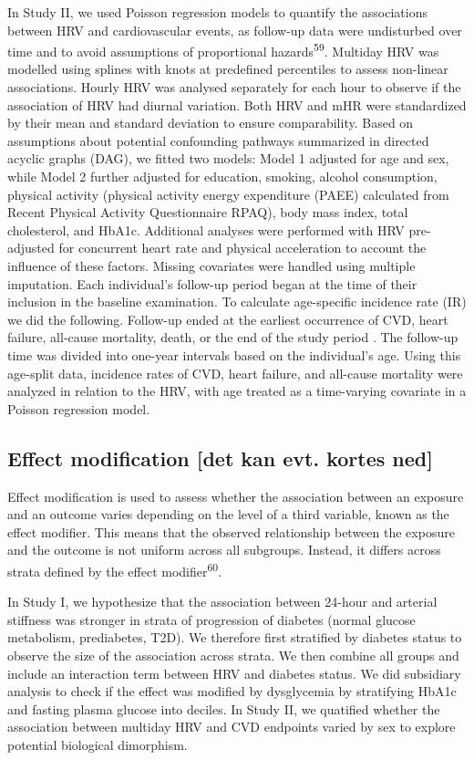 \documentclass[
  a4paper,
  headsepline=true,
  open=any]{scrbook}
\begin{document}
In Study II, we used Poisson regression models to quantify the
associations between HRV and cardiovascular events, as follow-up data
were undisturbed over time and to avoid assumptions of proportional
hazards\textsuperscript{59}. Multiday HRV was modelled using splines
with knots at predefined percentiles to assess non-linear associations.
Hourly HRV was analysed separately for each hour to observe if the
association of HRV had diurnal variation. Both HRV and mHR were
standardized by their mean and standard deviation to ensure
comparability. Based on assumptions about potential confounding pathways
summarized in directed acyclic graphs (DAG), we fitted two models: Model
1 adjusted for age and sex, while Model 2 further adjusted for
education, smoking, alcohol consumption, physical activity (physical
activity energy expenditure (PAEE) calculated from Recent Physical
Activity Questionnaire RPAQ), body mass index, total cholesterol, and
HbA1c. Additional analyses were performed with HRV pre-adjusted for
concurrent heart rate and physical acceleration to account the influence
of these factors. Missing covariates were handled using multiple
imputation. Each individual's follow-up period began at the time of
their inclusion in the baseline examination. To calculate age-specific
incidence rate (IR) we did the following. Follow-up ended at the
earliest occurrence of CVD, heart failure, all-cause mortality, death,
or the end of the study period . The follow-up time was divided into
one-year intervals based on the individual's age. Using this age-split
data, incidence rates of CVD, heart failure, and all-cause mortality
were analyzed in relation to the HRV, with age treated as a time-varying
covariate in a Poisson regression model.

\hypertarget{effect-modification-det-kan-evt.-kortes-ned}{%
\subsection{Effect modification {[}det kan evt. kortes
ned{]}}\label{effect-modification-det-kan-evt.-kortes-ned}}

Effect modification is used to assess whether the association between an
exposure and an outcome varies depending on the level of a third
variable, known as the effect modifier. This means that the observed
relationship between the exposure and the outcome is not uniform across
all subgroups. Instead, it differs across strata defined by the effect
modifier\textsuperscript{60}.

In Study I, we hypothesize that the association between 24-hour and
arterial stiffness was stronger in strata of progression of diabetes
(normal glucose metabolism, prediabetes, T2D). We therefore first
stratified by diabetes status to observe the size of the association
across strata. We then combine all groups and include an interaction
term between HRV and diabetes status. We did subsidiary analysis to
check if the effect was modified by dysglycemia by stratifying HbA1c and
fasting plasma glucose into deciles. In Study II, we quatified whether
the association between multiday HRV and CVD endpoints varied by sex to
explore potential biological dimorphism.
\end{document}
